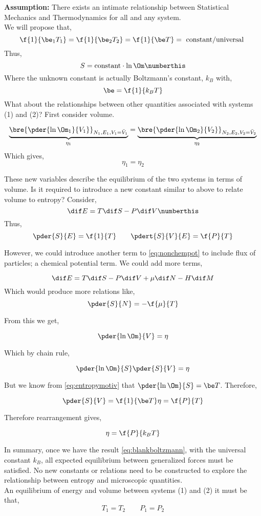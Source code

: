 \documentclass{article}
\begin{document}
\textbf{Assumption:} There exists an intimate relationship between Statistical Mechanics and Thermodynamics for all and any system. \\
We will propose that,
\[ \f{1}{\be_1T_1} = \f{1}{\be_2T_2} = \f{1}{\be T} = \text{ constant/universal } \]
Thus,
\[ S = \text{constant}\cdot \ln \Om \numberthis \label{eq:blankboltzmann} \]
Where the unknown constant is actually Boltzmann's constant, $k_B$ with,
\[  \be = \f{1}{k_B T} \]
What about the relationships between other quantities associated with systems (1) and (2)? First consider volume.

\[ \underbrace{\bre{\pder{\ln \Om_1}{V_1}}_{N_1, E_1, V_1 = \bar{V}_1}}_{\eta_1} = \underbrace{\bre{\pder{\ln \Om_2}{V_2}}_{N_2, E_2, V_2 = \bar{V}_2}}_{\eta_2} \]
Which gives,
\[ \eta_1 = \eta_2 \]

These new variables describe the equilibrium of the two systems in terms of volume. Is it required to introduce a new constant similar to above to relate volume to entropy? Consider,
\[ \dif E = T \dif S - P \dif V \numberthis \label{eq:nonchempot}\]
Thus,
\[ \pder{S}{E} = \f{1}{T} \qquad \pdert{S}{V}{E} = \f{P}{T} \]

However, we could introduce another term to \eqref{eq:nonchempot} to include flux of particles; a chemical potential term. We could add more terms,

\[ \dif E = T \dif S - P \dif V  + \mu \dif N - H \dif M\]
Which would produce more relations like,
\[ \pder{S}{N} = - \f{\mu}{T}\]

From this we get,

\[ \pder{\ln\Om}{V} = \eta \]

Which by chain rule,

\[ \pder{\ln\Om}{S}\pder{S}{V} = \eta \]

But we know from \eqref{eq:entropymotiv} that $\pder{\ln\Om}{S} = \be T$. Therefore,

\[ \pder{S}{V} = \f{1}{\be T} \eta = \f{P}{T} \]

Therefore rearrangement gives,

\[ \eta = \f{P}{k_B T} \]

In summary, once we have the result \eqref{eq:blankboltzmann}, with the universal constant $k_B$, all expected equilibrium between generalized forces must be satisfied. No new constants or relations need to be constructed to explore the relationship between entropy and microscopic quantities. \\

An equilibrium of energy and volume between systems (1) and (2) it must be that,
\[ T_1 = T_2 \qquad P_1 = P_2 \]
\end{document}
